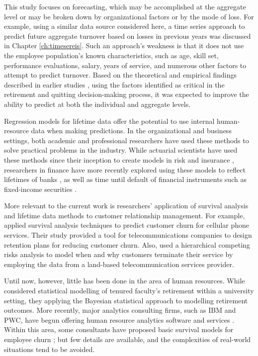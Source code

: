 
This study focuses on forecasting, which may be accomplished at the aggregate level or may be broken down by organizational factors or by the mode of loss.  For example, using a similar data source considered here, a time series approach to predict future aggregate turnover based on losses in previous years was discussed in Chapter \ref{ch:timesereis}. Such an approach's weakness is that it does not use the employee population's known characteristics, such as age, skill set, performance evaluations, salary, years of service, and numerous other factors to attempt to predict turnover. Based on the theoretical and empirical findings described in earlier studies  \citep{rainlall2004,Wang2010}, using the factors identified as critical in the retirement and quitting decision-making process, it was expected to improve the ability to predict at both the individual and aggregate levels.

Regression models for lifetime data offer the potential to use internal human-resource data when making predictions. In the organizational and business settings, both academic and professional researchers have used these methods to solve practical problems in the industry. While actuarial scientists have used these methods since their inception to create models in risk and insurance \citep{brockett2008}, researchers in finance have more recently explored using these models to reflect lifetimes of banks \citep{Lane1986}, as well as time until default of financial instruments such as fixed-income securities \citep{leclere2005}.

More relevant to the current work is researchers' application of survival analysis and lifetime data methods to customer relationship management. For example, \citet{lu2002} applied survival analysis techniques to predict customer churn for cellular phone services. Their study provided a tool for telecommunications companies to design retention plans for reducing customer churn. Also, \citet{braun2011} used a hierarchical competing risks analysis to model when and why customers terminate their service by employing the data from a land-based telecommunication services provider.

Until now, however, little has been done in the area of human resources. While \citet{berger1993} considered statistical modelling of tenured faculty's retirement within a university setting, they applying the Bayesian statistical approach to modelling retirement outcomes. More recently, major analytics consulting firms, such as IBM and PWC, have begun offering human resource analytics software and services \citep{IBM,PWC}. Within this area, some consultants have proposed basic survival models for employee churn \citep{briggs2015}; but few details are available, and the complexities of real-world situations tend to be avoided.

